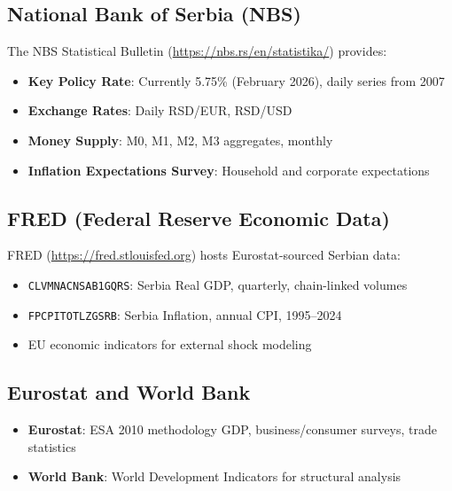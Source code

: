 \documentclass[12pt,a4paper]{article}
\begin{document}
\subsection{National Bank of Serbia (NBS)}

The NBS Statistical Bulletin (\url{https://nbs.rs/en/statistika/}) provides:

\begin{itemize}[leftmargin=*]
    \item \textbf{Key Policy Rate}: Currently 5.75\% (February 2026), daily series from 2007
    \item \textbf{Exchange Rates}: Daily RSD/EUR, RSD/USD
    \item \textbf{Money Supply}: M0, M1, M2, M3 aggregates, monthly
    \item \textbf{Inflation Expectations Survey}: Household and corporate expectations
\end{itemize}

\subsection{FRED (Federal Reserve Economic Data)}

FRED (\url{https://fred.stlouisfed.org}) hosts Eurostat-sourced Serbian data:

\begin{itemize}[leftmargin=*]
    \item \texttt{CLVMNACNSAB1GQRS}: Serbia Real GDP, quarterly, chain-linked volumes
    \item \texttt{FPCPITOTLZGSRB}: Serbia Inflation, annual CPI, 1995--2024
    \item EU economic indicators for external shock modeling
\end{itemize}

\subsection{Eurostat and World Bank}

\begin{itemize}[leftmargin=*]
    \item \textbf{Eurostat}: ESA 2010 methodology GDP, business/consumer surveys, trade statistics
    \item \textbf{World Bank}: World Development Indicators for structural analysis
\end{itemize}

\end{document}
